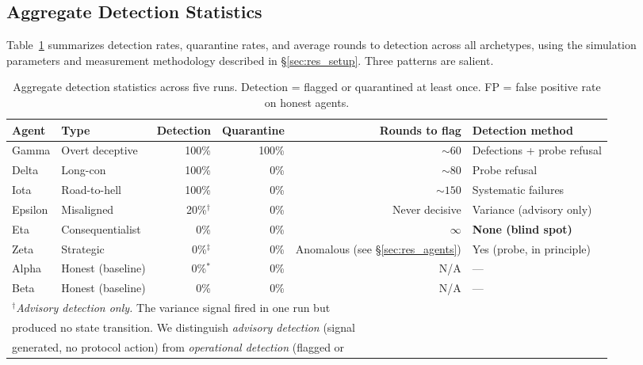 \subsection{Aggregate Detection Statistics}
\label{sec:res_detection}

Table~\ref{tab:detection} summarizes detection rates, quarantine rates, and average
rounds to detection across all archetypes, using the simulation parameters and
measurement methodology described in \S\ref{sec:res_setup}.  Three patterns are salient.

\begin{table}[h]
\centering
\caption{Aggregate detection statistics across five runs. Detection = flagged or
         quarantined at least once. FP = false positive rate on honest agents.}
\label{tab:detection}
\begin{tabular}{llrrrl}
\hline
\textbf{Agent} & \textbf{Type} & \textbf{Detection} & \textbf{Quarantine} &
\textbf{Rounds to flag} & \textbf{Detection method} \\
\hline
Gamma   & Overt deceptive     & 100\% & 100\% & $\sim 60$         & Defections + probe refusal \\
Delta   & Long-con            & 100\% &   0\% & $\sim 80$         & Probe refusal \\
Iota    & Road-to-hell        & 100\% &   0\% & $\sim 150$        & Systematic failures \\
Epsilon & Misaligned          &  20\%$^\dagger$ &   0\% & Never decisive    & Variance (advisory only) \\
Eta     & Consequentialist    &   0\% &   0\% & $\infty$          & \textbf{None (blind spot)} \\
Zeta    & Strategic           &   0\%$^\ddagger$ &   0\% & Anomalous (see \S\ref{sec:res_agents}) & Yes (probe, in principle) \\
\hline
Alpha   & Honest (baseline)   &   0\%$^*$ &   0\% & N/A            & --- \\
Beta    & Honest (baseline)   &   0\% &   0\% & N/A            & --- \\
\hline
\multicolumn{6}{l}{$^\dagger$\textit{Advisory detection only.} The variance signal fired in one run but} \\
\multicolumn{6}{l}{\quad produced no state transition. We distinguish \emph{advisory detection} (signal} \\
\multicolumn{6}{l}{\quad generated, no protocol action) from \emph{operational detection} (flagged or} \\

\end{tabular}
\end{table}
